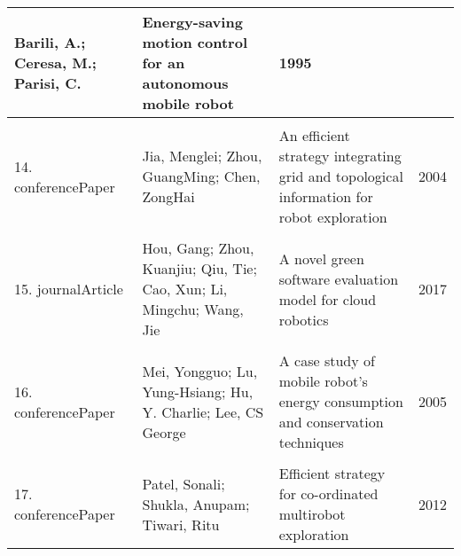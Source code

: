 \begin{table}[h]
\begin{tabular}{lp{5cm}p{9cm}c}
                {Barili, A.; Ceresa, M.; Parisi, C.} &
                {Energy-saving motion control for an autonomous mobile robot} &
                {1995} \\
            \hline
            \\
            {14.}
                {conferencePaper} &
                {Jia, Menglei; Zhou, GuangMing; Chen, ZongHai} &
                {An efficient strategy integrating grid and topological information for robot exploration} &
                {2004} \\
            \hline
            \\
            {15.}
                {journalArticle} &
                {Hou, Gang; Zhou, Kuanjiu; Qiu, Tie; Cao, Xun; Li, Mingchu; Wang, Jie} &
                {A novel green software evaluation model for cloud robotics} &
                {2017} \\
            \hline
            \\
            {16.}
                {conferencePaper} &
                {Mei, Yongguo; Lu, Yung-Hsiang; Hu, Y. Charlie; Lee, CS George} &
                {A case study of mobile robot's energy consumption and conservation techniques} &
                {2005} \\      
            \hline
            \\
            {17.}
                {conferencePaper} &
                {Patel, Sonali; Shukla, Anupam; Tiwari, Ritu} &
                {Efficient strategy for co-ordinated multirobot exploration} &
                {2012} \\
        \bottomrule
    \end{tabular}
    \label{table:primary_studies}
\end{table}